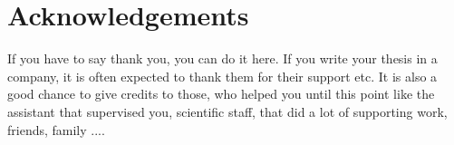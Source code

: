 \chapter*{Acknowledgements}
If you have to say thank you, you can do it here. If you write your thesis in a company, it is often expected to thank them for their support etc. It is also a good chance to give credits to those, who helped you until this point like the assistant that supervised you, scientific staff, that did a lot of supporting work, friends, family ....